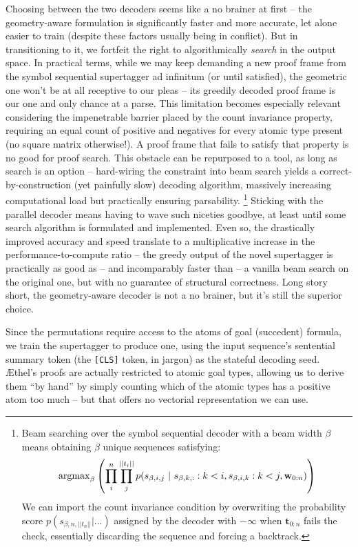 Choosing between the two decoders seems like a no brainer at first -- the geometry-aware formulation is significantly faster and more accurate, let alone easier to train (despite these factors usually being in conflict).
But in transitioning to it, we fortfeit the right to algorithmically \textit{search} in the output space.
In practical terms, while we may keep demanding a new proof frame from the symbol sequential supertagger ad infinitum (or until satisfied), the geometric one won't be at all receptive to our pleas -- its greedily decoded proof frame is our one and only chance at a parse.
This limitation becomes especially relevant considering the impenetrable barrier placed by the count invariance property, requiring an equal count of positive and negatives for every atomic type present (no square matrix otherwise!).
A proof frame that fails to satisfy that property is no good for proof search.
This obstacle can be repurposed to a tool, as long as search is an option -- hard-wiring the constraint into beam search yields a correct-by-construction (yet painfully slow) decoding algorithm, massively increasing computational load but practically ensuring parsability.%
	\footnote{
	Beam searching over the symbol sequential decoder with a beam width $\beta$ means obtaining $\beta$ unique sequences satisfying:
	\[
		\mathrm{argmax}_{\beta}\left(
		\prod_i^n \prod_j^{|| t_i ||} 
		p(s_{\beta, i, j} \ | \ 
			s_{\beta, k, :} : k < i,
			s_{\beta, i, k} : k < j,
			\wseq)
		\right)
	\]
	We can import the count invariance condition by overwriting the probability score $p(s_{\beta, n, ||t_n||} | \dots )$ assigned by the decoder with $-\infty$ when $\mathbf{t}_{0:n}$ fails the check, essentially discarding the sequence and forcing a backtrack.
}
Sticking with the parallel decoder means having to wave such niceties goodbye, at least until some search algorithm is formulated and implemented.
Even so, the drastically improved accuracy and speed translate to a multiplicative increase in the performance-to-compute ratio -- the greedy output of the novel supertagger is practically as good as -- and incomparably faster than -- a vanilla beam search on the original one, but with no guarantee of structural correctness.
Long story short, the geometry-aware decoder is not a no brainer, but it's still the superior choice.

Since the permutations require access to the atoms of goal (succedent) formula, we train the supertagger to produce one, using the input sequence's sentential summary token (the \texttt{[CLS]} token, in jargon) as the stateful decoding seed.
\AE thel's proofs are actually restricted to atomic goal types, allowing us to derive them ``by hand'' by simply counting which of the atomic types has a positive atom too much -- but that offers no vectorial representation we can use.

